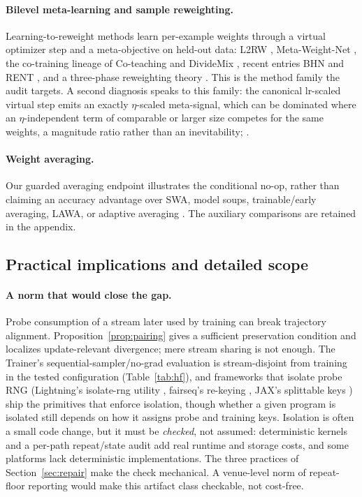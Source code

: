 \paragraph{Bilevel meta-learning and sample reweighting.}
Learning-to-reweight methods learn per-example weights through a virtual
optimizer step and a meta-objective on held-out data: L2RW
\citep{ren2018learning}, Meta-Weight-Net \citep{shu2019metaweightnet}, the
co-training lineage of Co-teaching \citep{han2018coteaching} and DivideMix
\citep{li2020dividemix}, recent entries BHN \citep{yu2023bhn} and RENT
\citep{bae2024rent}, and a three-phase reweighting theory
\citep{zhang2025revisiting}. This is the method family the audit targets. A
second\diagtwoscope{}
diagnosis speaks to this family: the canonical lr-scaled
virtual step emits an exactly $\eta$-scaled meta-signal, which can be dominated
where an $\eta$-independent term of comparable or larger size competes for the
same weights, a magnitude ratio rather than an inevitability;
\diagtwopointer{}.

\paragraph{Weight averaging.}
Our guarded averaging endpoint illustrates the conditional no-op, rather
than claiming an accuracy advantage over SWA, model soups, trainable/early
averaging, LAWA, or adaptive averaging
\citep{izmailov2018averaging,wortsman2022soups,li2023twa,sanyal2024early,
kaddour2022lawa,demir2024aswa,melis2022twotailed,wang2025sewa,ajroldi2025when}.
The auxiliary comparisons are retained in the appendix.

\subsection{Practical implications and detailed scope}


\paragraph{A norm that would close the gap.}
Probe consumption of a stream later used by training can break trajectory
alignment. Proposition~\ref{prop:pairing} gives a sufficient preservation
condition and localizes update-relevant divergence; mere stream sharing
is not enough. The Trainer's
sequential-sampler/no-grad evaluation is stream-disjoint from training in the tested configuration
(Table~\ref{tab:hf}), and frameworks that
isolate probe RNG (Lightning's isolate-rng utility
\citep{falcon2019lightning}, fairseq's re-keying \citep{ott2019fairseq}, JAX's
splittable keys \citep{jax2018prng}) ship the primitives that enforce
isolation, though whether a given program is isolated still depends on how it
assigns probe and training keys. Isolation is
often a small code change, but it must be \emph{checked}, not assumed:
deterministic kernels and a per-path repeat/state audit add real runtime and
storage costs, and some platforms lack deterministic implementations. The
three practices of Section~\ref{sec:repair} make the check mechanical. A
venue-level norm of repeat-floor reporting would make this artifact class
checkable, not cost-free.

